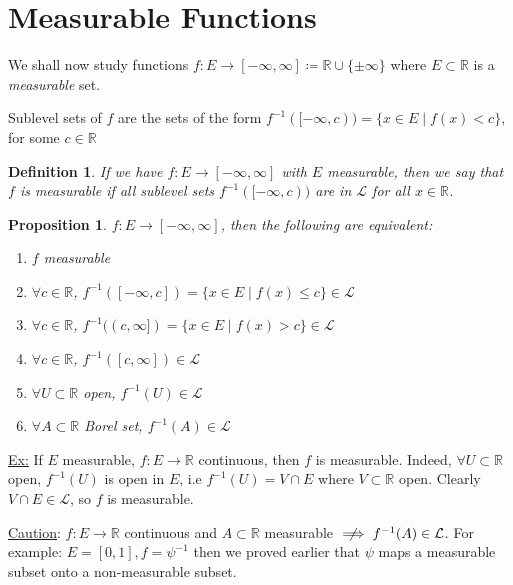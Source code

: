 \documentclass[11pt]{article}
\newtheorem*{prop}{Proposition}
\newtheorem{definition}{Definition}[section]
\newcommand{\R}{\mathbb{R}}
\newcommand{\Le}{\mathcal{L}}
\begin{document}
    \section{Measurable Functions}\label{sec:measurable-functions}

    We shall now study functions $f : E \rightarrow [-\infty, \infty] \coloneqq \mathbb{R} \cup \{ \pm \infty \}$ where $E \subset \mathbb{R}$ is a \emph{measurable} set.

    Sublevel sets of $f$ are the sets of the form $f^{-1}([-\infty, c)) = \{ x \in E \mid f(x) < c \}$, for some $c \in \mathbb{R}$

    \begin{definition}
        If we have $f : E \rightarrow [-\infty, \infty]$ with $E$ measurable, then we say that $f$ is measurable if all sublevel sets $f^{-1}([-\infty, c))$ are in $\mathcal{L}$ for all $x \in \mathbb{R}$.
    \end{definition}

    \begin{prop}
        $f : E \rightarrow [-\infty, \infty]$, then the following are equivalent:
        \begin{enumerate}
            \item $f$ measurable
            \item $\forall c \in \mathbb{R}$, $f^{-1}([-\infty, c]) = \{x \in E \mid f(x) \leq c \} \in \mathcal{L}$
            \item $\forall c \in \mathbb{R}$, $f^{-1}((c, \infty]) = \{x \in E \mid f(x) > c \} \in \mathcal{L}$
            \item $\forall c \in \mathbb{R}$, $f^{-1}([c, \infty])  \in \mathcal{L}$
            \item $\forall U \subset \mathbb{R}$ open, $f^{-1}(U) \in \Le$
            \item $\forall A \subset \mathbb{R}$ Borel set, $f^{-1}(A) \in \Le$
        \end{enumerate}
    \end{prop}

    \underline{Ex:} If $E$ measurable, $f: E \rightarrow \R$ continuous, then $f$ is measurable.
    Indeed, $\forall U \subset \R$ open, $f^{-1}(U)$ is open in $E$, i.e $f^{-1}(U) = V \cap E$ where $V \subset \R$ open.
    Clearly $V \cap E \in \Le$, so $f$ is measurable.

    \underline{Caution}: $f: E \rightarrow \R$ continuous and $A \subset \R$ measurable $\centernot\implies f^{-1}(A) \in \Le$.
    For example: $E = [0,1], f = \psi^{-1}$ then we proved earlier that $\psi$ maps a measurable subset onto a non-measurable subset.
\end{document}
